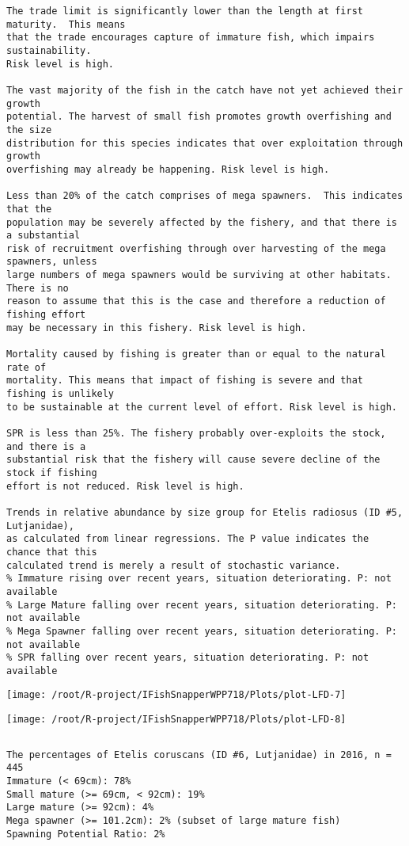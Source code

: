 \documentclass{report}\usepackage[]{graphicx}\usepackage[]{color}
\makeatletter
\def\maxwidth{ %
  \ifdim\Gin@nat@width>\linewidth
    \linewidth
  \else
    \Gin@nat@width
  \fi
}
\newenvironment{kframe}{%
 \def\at@end@of@kframe{}%
 \ifinner\ifhmode%
  \def\at@end@of@kframe{\end{minipage}}%
  \begin{minipage}{\columnwidth}%
 \fi\fi%
 \def\FrameCommand##1{\hskip\@totalleftmargin \hskip-\fboxsep
 \colorbox{shadecolor}{##1}\hskip-\fboxsep
     \hskip-\linewidth \hskip-\@totalleftmargin \hskip\columnwidth}%
 \MakeFramed {\advance\hsize-\width
   \@totalleftmargin\z@ \linewidth\hsize
   \@setminipage}}%
 {\par\unskip\endMakeFramed%
 \at@end@of@kframe}
\newenvironment{knitrout}{}{} %
\makeatother
\begin{document}
\begin{knitrout}
\begin{kframe}
\begin{verbatim}
The trade limit is significantly lower than the length at first maturity.  This means
that the trade encourages capture of immature fish, which impairs sustainability.
Risk level is high.

The vast majority of the fish in the catch have not yet achieved their growth
potential. The harvest of small fish promotes growth overfishing and the size
distribution for this species indicates that over exploitation through growth
overfishing may already be happening. Risk level is high.

Less than 20% of the catch comprises of mega spawners.  This indicates that the
population may be severely affected by the fishery, and that there is a substantial
risk of recruitment overfishing through over harvesting of the mega spawners, unless
large numbers of mega spawners would be surviving at other habitats. There is no
reason to assume that this is the case and therefore a reduction of fishing effort
may be necessary in this fishery. Risk level is high.
 
Mortality caused by fishing is greater than or equal to the natural rate of
mortality. This means that impact of fishing is severe and that fishing is unlikely
to be sustainable at the current level of effort. Risk level is high.
 
SPR is less than 25%. The fishery probably over-exploits the stock, and there is a
substantial risk that the fishery will cause severe decline of the stock if fishing
effort is not reduced. Risk level is high.
 
Trends in relative abundance by size group for Etelis radiosus (ID #5, Lutjanidae),
as calculated from linear regressions. The P value indicates the chance that this
calculated trend is merely a result of stochastic variance.
% Immature rising over recent years, situation deteriorating. P: not available
% Large Mature falling over recent years, situation deteriorating. P: not available
% Mega Spawner falling over recent years, situation deteriorating. P: not available
% SPR falling over recent years, situation deteriorating. P: not available
\end{verbatim}
\end{kframe}
\texttt{[image: /root/R-project/IFishSnapperWPP718/Plots/plot-LFD-7]} 

\texttt{[image: /root/R-project/IFishSnapperWPP718/Plots/plot-LFD-8]} 
\begin{kframe}\begin{verbatim}
\end{verbatim}
\end{kframe}
\clearpage
\newpage
\begin{kframe}\begin{verbatim}The percentages of Etelis coruscans (ID #6, Lutjanidae) in 2016, n = 445
Immature (< 69cm): 78%
Small mature (>= 69cm, < 92cm): 19%
Large mature (>= 92cm): 4%
Mega spawner (>= 101.2cm): 2% (subset of large mature fish)
Spawning Potential Ratio: 2%
 

\end{verbatim}
\end{kframe}
\end{knitrout}
\end{document}
